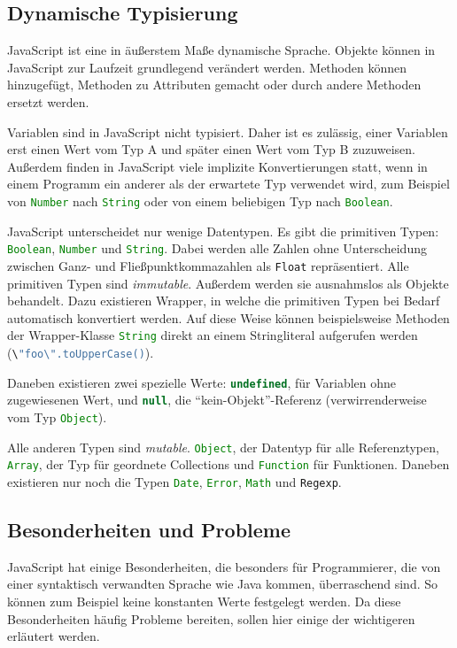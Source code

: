\documentclass[a4paper, 12pt, hidelinks, listof=totoc, listoftables=totoc, bibliography=totoc]{scrreprt}
\newcommand{\js}[1]{\lstinline[language=JavaScript, style=inline]|#1|}
\begin{document}
\subsection{Dynamische Typisierung}

JavaScript ist eine in äußerstem Maße dynamische Sprache. Objekte können in JavaScript zur Laufzeit grundlegend verändert werden. Methoden können hinzugefügt, Methoden zu Attributen gemacht oder durch andere Methoden ersetzt werden.

Variablen sind in JavaScript nicht typisiert. Daher ist es zulässig, einer Variablen erst einen Wert vom Typ A und später einen Wert vom Typ B zuzuweisen. Außerdem finden in JavaScript viele implizite Konvertierungen statt, wenn in einem Programm ein anderer als der erwartete Typ verwendet wird, zum Beispiel von \js{Number} nach \js{String} oder von einem beliebigen Typ nach \js{Boolean}.

JavaScript unterscheidet nur wenige Datentypen. Es gibt die primitiven Typen: \js{Boolean}, \js{Number} und \js{String}. 
Dabei werden alle Zahlen ohne Unterscheidung zwischen Ganz- und Fließpunktkommazahlen als \js{Float} repräsentiert. Alle primitiven Typen sind \emph{immutable}. Außerdem werden sie ausnahmslos als Objekte behandelt. Dazu existieren Wrapper, in welche die primitiven Typen bei Bedarf automatisch konvertiert werden. Auf diese Weise können beispielsweise Methoden der Wrapper-Klasse \js{String} direkt an einem Stringliteral aufgerufen werden (\js{\"foo\".toUpperCase()}).

Daneben existieren zwei spezielle Werte: \js{undefined}, für Variablen ohne zugewiesenen Wert, und \js{null}, die "`kein-Objekt"'-Referenz (verwirrenderweise vom Typ \js{Object}).

Alle anderen Typen sind \emph{mutable}. \js{Object}, der Datentyp für alle Referenztypen, \js{Array}, der Typ für geordnete Collections und \js{Function} für Funktionen. Daneben existieren nur noch die Typen \js{Date}, \js{Error}, \js{Math} und \js{Regexp}. \cite[S. 29 ff.]{flanagan2011.JDG}


\subsection{Besonderheiten und Probleme}

JavaScript hat einige Besonderheiten, die besonders für Programmierer, die von einer syntaktisch verwandten Sprache wie Java kommen, überraschend sind. So können zum Beispiel keine konstanten Werte festgelegt werden. Da diese Besonderheiten häufig Probleme bereiten, sollen hier einige der wichtigeren erläutert werden.
\end{document}
